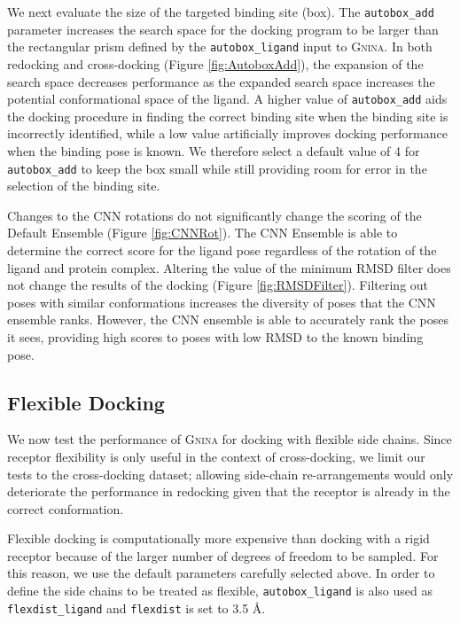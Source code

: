 \documentclass[journal=jcisd8,manuscript=article]{achemso}
\begin{document}
We next evaluate the size of the targeted binding site (box). The \texttt{autobox\_add} parameter increases the search space for the docking program to be larger than the rectangular prism defined by the \texttt{autobox\_ligand} input to \textsc{Gnina}. In both redocking and cross-docking (Figure \ref{fig:AutoboxAdd}), the expansion of the search space decreases performance as the expanded search space increases the potential conformational space of the ligand. A higher value of \texttt{autobox\_add} aids the docking procedure in finding the correct binding site when the binding site is incorrectly identified, while a low value artificially improves docking performance when the binding pose is known. We therefore select a default value of 4 for \texttt{autobox\_add} to keep the box small while still providing room for error in the selection of the binding site.

Changes to the CNN rotations do not significantly change the scoring of the Default Ensemble (Figure \ref{fig:CNNRot}). The CNN Ensemble is able to determine the correct score for the ligand pose regardless of the rotation of the ligand and protein complex. Altering the value of the minimum RMSD filter does not change the results of the docking (Figure \ref{fig:RMSDFilter}).  Filtering out poses with similar conformations increases the diversity of poses that the CNN ensemble ranks. However, the CNN ensemble is able to accurately rank the poses it sees, providing high scores to poses with low RMSD to the known binding pose.

\subsection{Flexible Docking}

We now test the performance of \textsc{Gnina} for docking with flexible side chains. Since receptor flexibility is only useful in the context of cross-docking, we limit our tests to the cross-docking dataset; allowing side-chain re-arrangements would only deteriorate the performance in redocking given that the receptor is already in the correct conformation.

Flexible docking is computationally more expensive than docking with a rigid receptor because of the larger number of degrees of freedom to be sampled. For this reason, we use the default parameters carefully selected above. In order to define the side chains to be treated as flexible, \texttt{autobox\_ligand} is also used as \texttt{flexdist\_ligand} and \texttt{flexdist} is set to 3.5 \AA.
\end{document}
